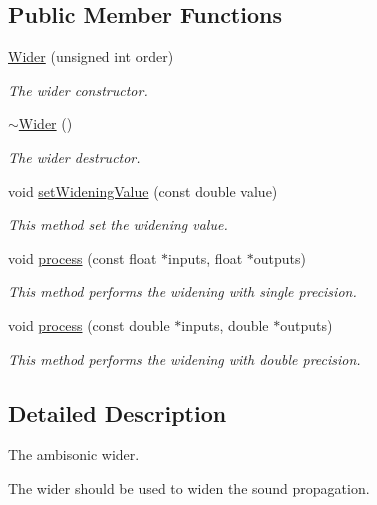 \subsection*{Public Member Functions}
\begin{DoxyCompactItemize}
\item 
\hyperlink{class_hoa3_d_1_1_wider_a7f1f80e3329872d06f8e81f60f24e102}{Wider} (unsigned int order)
\begin{DoxyCompactList}\small\item\em The wider constructor. \end{DoxyCompactList}\item 
\hyperlink{class_hoa3_d_1_1_wider_a4a2770414c2753a9c92740f02641db38}{$\sim$\-Wider} ()
\begin{DoxyCompactList}\small\item\em The wider destructor. \end{DoxyCompactList}\item 
void \hyperlink{class_hoa3_d_1_1_wider_a5981d4dafbb0d2ce4ea20ec7cd1fb114}{set\-Widening\-Value} (const double value)
\begin{DoxyCompactList}\small\item\em This method set the widening value. \end{DoxyCompactList}\item 
void \hyperlink{class_hoa3_d_1_1_wider_a605d68c56ca7a541a9e91bd2aa9a9ea0}{process} (const float $\ast$inputs, float $\ast$outputs)
\begin{DoxyCompactList}\small\item\em This method performs the widening with single precision. \end{DoxyCompactList}\item 
void \hyperlink{class_hoa3_d_1_1_wider_a94fa445b540cbafeaafa05d4ed1a20bf}{process} (const double $\ast$inputs, double $\ast$outputs)
\begin{DoxyCompactList}\small\item\em This method performs the widening with double precision. \end{DoxyCompactList}\end{DoxyCompactItemize}


\subsection{Detailed Description}
The ambisonic wider. 

The wider should be used to widen the sound propagation. 

